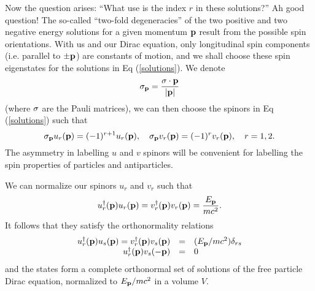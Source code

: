 Now the question arises: ``What use is the index $r$ in these solutions?'' Ah
good question! The so-called ``two-fold degeneracies'' of the two positive and
two negative energy solutions for a given momentum $\bold{p}$ result from the
possible spin orientations. With us and our Dirac equation, only longitudinal
spin components (i.e. parallel to $\pm\bold{p}$) are constants of motion, and
we shall choose these spin eigenstates for the solutions in Eq (\ref{solutions}).
We denote
\begin{equation}
\sigma_{\bold{p}} = \frac{\bold{\sigma}\cdot\bold{p}}{|\bold{p}|}
\end{equation}
(where $\bold{\sigma}$ are the Pauli matrices), we can then choose the spinors
in Eq (\ref{solutions}) such that
\begin{equation}
\sigma_{\bold{p}}u_r(\bold{p}) = (-1)^{r+1}u_{r}(\bold{p}),
\quad\sigma_{\bold{p}}v_{r}(\bold{p}) = (-1)^{r}v_{r}(\bold{p}),
\quad r=1,2.
\end{equation}
The asymmetry in labelling $u$ and $v$ spinors will be convenient for labelling
the spin properties of particles and antiparticles.

We can normalize our spinors $u_r$ and $v_r$ such that
\begin{equation}
u_{r}^{\dag}(\bold{p})u_{r}(\bold{p}) = v_{r}^{\dag}(\bold{p})v_{r}(\bold{p})=\frac{E_{\bold{p}}}{mc^2}.
\end{equation}
It follows that they satisfy the orthonormality relations
\begin{equation}
\begin{array}{rcl}
u_{r}^{\dag}(\bold{p})u_{s}(\bold{p}) = v_{r}^{\dag}(\bold{p})v_{s}(\bold{p}) &=& (E_{\bold{p}}/mc^2)\delta_{rs} \\
u^{\dag}_{r}(\bold{p})v_{s}(-\bold{p}) &=& 0
\end{array}
\end{equation}
and the states form a complete orthonormal set of solutions of the free particle
Dirac equation, normalized to $E_{\bold{p}}/mc^2$ in a volume $V$.
